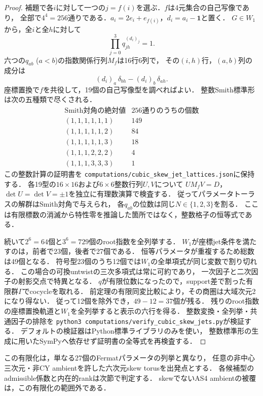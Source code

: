 \begin{proof}
補題で各$i$に対して一つの$j=f(i)$を選ぶ．$f$は4元集合の自己写像であり，
全部で$4^4=256$通りである．$a_i=2e_i+e_{f(i)}$，$d_i=a_i-\mathbf1$と置く．
$G\in W_1$から，全$i$と全$h$に対して
\[
 \prod_{j=0}^3 q_{jh}^{(d_i)_j}=1.
\]
六つの$q_{ab}$ ($a<b$)の指数関係行列$M_f$は16行6列で，
その$(i,h)$行，$(a,b)$列の成分は
\[
 (d_i)_a\,\delta_{bh}-(d_i)_b\,\delta_{ah}.
\]
座標置換で$f$を共役して，19個の自己写像型を調べればよい．
整数Smith標準形は次の五種類で尽くされる．
\[
\begin{array}{c|r}
\text{Smith対角の絶対値}&256通りのうちの個数\\\hline
(1,1,1,1,1,1)&149\\
(1,1,1,1,1,2)&84\\
(1,1,1,1,1,3)&18\\
(1,1,1,2,2,2)&4\\
(1,1,1,3,3,3)&1
\end{array}
\]
この整数計算の証明書を
\texttt{computations/cubic\_skew\_jet\_lattices.json}に保持する．
各19型の$16\times16$および$6\times6$整数行列$U,V$について
$UM_fV=D$，$\det U=\det V=\pm1$を独立に有理数演算で検査する．
従ってパラメータトーラスの解群はSmith対角で与えられ，
各$q_{ab}$の位数は同じ$N\in\{1,2,3\}$を割る．
ここは有限標数の消滅から特性零を推論した箇所ではなく，整数格子の恒等式である．

続いて$2^6=64$個と$3^6=729$個のroot指数を全列挙する．
$W_1$が座標jet条件を満たすのは，前者で23個，後者で27個である．
恒等パラメータが重複するため総数は49個となる．
符号型23個のうち12個では$W_1$の全単項式が同じ変数で割り切れる．
この場合の可換untwistの三次多項式は常に可約であり，
一次因子と二次因子の射影交点で特異となる．
$q$が有限位数になったので，support差で割った有限群$\Gamma$でcocycleを取れる．
前定理の有限同変比較により，その商圏は大域次元2になり得ない．
従って12個を除外でき，$49-12=37$個が残る．
残りのroot指数の座標置換軌道と$W_1$を全列挙すると表示の六行を得る．
整数変換・全列挙・共通因子の排除を
\texttt{python3 computations/verify\_cubic\_skew\_jets.py}が検証する．
デフォルトの検証器はPython標準ライブラリのみを使い，
整数標準形の生成に用いたSymPyへ依存せず証明書の全等式を再検査する．
\end{proof}

この有限化は，単なる27個のFermatパラメータの列挙と異なり，
任意の非中心三次元・非CY ambientを許した六次元skew torusを出発点とする．
各候補型のadmissible係数と内在的rankは次節で判定する．
skewでないAS4 ambientの被覆は，この有限化の範囲外である．
